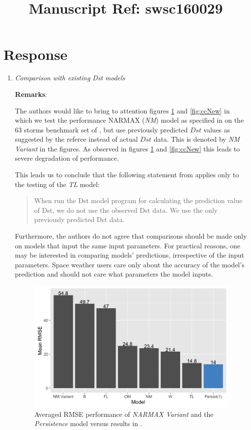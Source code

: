 \documentclass{article}
\begin{document}
\title{Manuscript Ref: swsc160029}
\maketitle
\section*{Response}

\begin{enumerate}
\item \emph{Comparison with existing Dst models}

\textbf{Remarks}: 

The authors would like to bring to attention figures \ref{fig:rmseNew} and \ref{fig:ccNew} in which we test the performance NARMAX (\emph{NM}) model as specified in \cite{balikhin:narmax} on the 63 storms benchmark set of \cite{Ji2012}, but use previously predicted $Dst$ values as suggested by the referee instead of actual $Dst$ data. %
This is denoted by \emph{NM Variant} in the figures. As observed in figures \ref{fig:rmseNew} and \ref{fig:ccNew} this leads to severe degradation of performance. 

This leads us to conclude that the following statement from \cite{Ji2012} applies only to the testing of the \emph{TL} model: \blockquote{When run the Dst model program for calculating the prediction value of Dst, we do not use the observed Dst data. We use the only previously predicted Dst data.}

Furthermore, the authors do not agree that comparisons should be made only on models that input the same input parameters. For practical reasons, one may be interested in comparing models’ predictions, irrespective of the input parameters. Space weather users care only about the accuracy of the model’s prediction and should not care what parameters the model inputs.


\begin{figure}
   \centering
   \includegraphics[width=\textwidth]{Compare_RMSE_New.png}
      \caption{
      Averaged RMSE performance of \emph{NARMAX Variant} and the 
      \emph{Persistence} model versus results in \cite{Ji2012}.
      }
      \label{fig:rmseNew}
\end{figure}


\end{enumerate}
\end{document}
